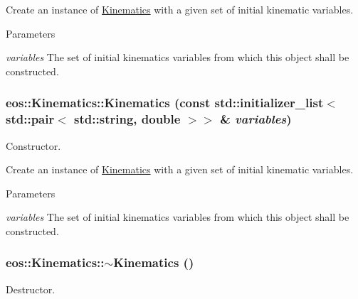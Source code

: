 Create an instance of \hyperlink{classeos_1_1Kinematics}{Kinematics} with a given set of initial kinematic variables.


\begin{DoxyParams}{Parameters}
\item[{\em variables}]The set of initial kinematics variables from which this object shall be constructed. \end{DoxyParams}
\hypertarget{classeos_1_1Kinematics_add9a8894b7712980d4ff89440ba87f5c}{
\subsubsection[{Kinematics}]{\setlength{\rightskip}{0pt plus 5cm}eos::Kinematics::Kinematics (const std::initializer\_\-list$<$ std::pair$<$ std::string, double $>$$>$ \& {\em variables})}}
\label{classeos_1_1Kinematics_add9a8894b7712980d4ff89440ba87f5c}
Constructor.

Create an instance of \hyperlink{classeos_1_1Kinematics}{Kinematics} with a given set of initial kinematic variables.


\begin{DoxyParams}{Parameters}
\item[{\em variables}]The set of initial kinematics variables from which this object shall be constructed. \end{DoxyParams}
\hypertarget{classeos_1_1Kinematics_a9ec2eee0f195a921a50de942bfb7d38f}{
\subsubsection[{$\sim$Kinematics}]{\setlength{\rightskip}{0pt plus 5cm}eos::Kinematics::$\sim$Kinematics ()}}
\label{classeos_1_1Kinematics_a9ec2eee0f195a921a50de942bfb7d38f}


Destructor. 


